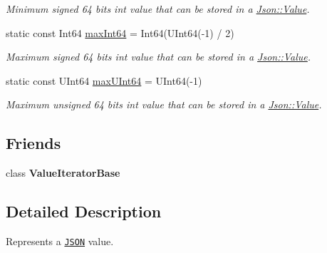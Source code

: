 \begin{DoxyCompactItemize}
\begin{DoxyCompactList}\small\item\em Minimum signed 64 bits int value that can be stored in a \hyperlink{classJson_1_1Value}{Json\+::\+Value}. \end{DoxyCompactList}\item 
\mbox{\label{classJson_1_1Value_a4492634870b8c5709ce967b384ac6006}} 
static const Int64 \hyperlink{classJson_1_1Value_a4492634870b8c5709ce967b384ac6006}{max\+Int64} = Int64(U\+Int64(-\/1) / 2)
\begin{DoxyCompactList}\small\item\em Maximum signed 64 bits int value that can be stored in a \hyperlink{classJson_1_1Value}{Json\+::\+Value}. \end{DoxyCompactList}\item 
\mbox{\label{classJson_1_1Value_ae1eb89c305c39516696ff305cffa01da}} 
static const U\+Int64 \hyperlink{classJson_1_1Value_ae1eb89c305c39516696ff305cffa01da}{max\+U\+Int64} = U\+Int64(-\/1)
\begin{DoxyCompactList}\small\item\em Maximum unsigned 64 bits int value that can be stored in a \hyperlink{classJson_1_1Value}{Json\+::\+Value}. \end{DoxyCompactList}\end{DoxyCompactItemize}
\subsection*{Friends}
\begin{DoxyCompactItemize}
\item 
\mbox{\label{classJson_1_1Value_ad016df56489e5d360735457afba2f649}} 
class {\bfseries Value\+Iterator\+Base}
\end{DoxyCompactItemize}


\subsection{Detailed Description}
Represents a \href{http://www.json.org}{\tt J\+S\+ON} value. 

